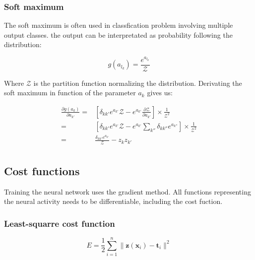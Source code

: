 \documentclass[final, paper=letter,5p,times,twocolumn]{elsarticle}
\begin{document}
\subsubsection{Soft maximum}
\label{soft_max_sec}

The soft maximum is often used in classfication problem involving multiple output classes. the output can be interpretated as probability following the distribution:

\begin{equation}
  g(a_{l_{k}}) = \frac{e^{a_{l_{k}}}}{\mathcal{Z}}
  \label{soft_max}
\end{equation}

Where $\mathcal{Z}$ is the partition function normalizing the distribution. Derivating the soft maximum in function of the parameter $a_{k}$ gives us:

\begin{equation*}
  \begin{split}
    \frac{\partial g(a_{k})}{\partial a_{k'}} = & \left \lbrack \delta_{kk'} e^{a_{k'}} \mathcal{Z} - e^{a_{k'}}\frac{\partial \mathcal{Z}}{\partial a_{k'}} \right \rbrack \times \frac{1}{\mathcal{Z}^{2}}\\
    = & \left \lbrack \delta_{kk'} e^{a_{k'}} \mathcal{Z} - e^{a_{k'}} \sum_{k''} \delta_{kk''} e^{a_{k''}}  \right \rbrack \times \frac{1}{\mathcal{Z}^{2}}\\
    = & \frac{\delta_{kk'} e^{a_{k'}}}{\mathcal{Z}} - z_{k}z_{k'}\\
  \end{split}
\end{equation*}

\lipsum[2-2]

\subsection{Cost functions}

Training the neural network uses the gradient method. All functions representing the neural activity needs to be differentiable, including the cost fuction. \lipsum[3-3]

\subsubsection{Least-squarre cost function}

\begin{equation}
  E = \frac{1}{2} \sum_{i = 1}^{n} \| \bm{z}(\bm{x}_{i}) - \bm{t}_{i} \|^{2}
  \label{least_squarre}
\end{equation}
\end{document}
